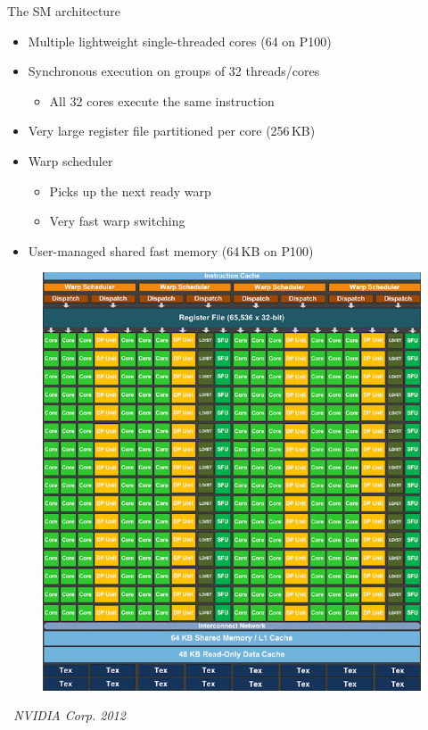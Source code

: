 \documentclass[aspectratio=169,12pt]{beamer}
\begin{document}
\begin{frame}{The SM architecture}
  \begin{minipage}{.74\textwidth}
    \small
    \begin{itemize}
    \item Multiple lightweight single-threaded cores (64 on P100)
    \item Synchronous execution on groups of 32 threads/cores
      \begin{itemize}
      \item All 32 cores execute the same instruction
      \end{itemize}
    \item Very large register file partitioned per core (256\,KB)
    \item Warp scheduler
      \begin{itemize}
      \item Picks up the next ready warp
      \item Very fast warp switching
      \end{itemize}
    \item User-managed shared fast memory (64\,KB on P100)
    \end{itemize}
  \end{minipage}
  \begin{minipage}{.25\textwidth}
    \begin{figure}
      \centering
      \includegraphics[width=\textwidth,height=.7\textheight]{smx_arch.png}
    \end{figure}
    \begin{center}
      \vspace{-\baselineskip}
      \emph{\scriptsize\textcopyright\ NVIDIA Corp. 2012}
    \end{center}
  \end{minipage}
\end{frame}
\end{document}
